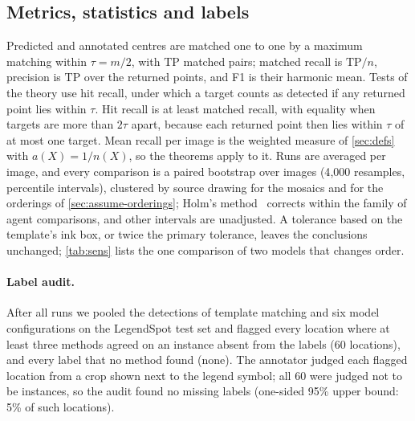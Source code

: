 \subsection{Metrics, statistics and labels}
\label{sec:stats}

Predicted and annotated centres are matched one to one by a maximum matching within $\tau = m/2$, with $\mathrm{TP}$ matched pairs; matched recall is $\mathrm{TP}/n$, precision is $\mathrm{TP}$ over the returned points, and F1 is their harmonic mean. Tests of the theory use hit recall, under which a target counts as detected if any returned point lies within $\tau$. Hit recall is at least matched recall, with equality when targets are more than $2\tau$ apart, because each returned point then lies within $\tau$ of at most one target. Mean recall per image is the weighted measure of \cref{sec:defs} with $a(X) = 1/n(X)$, so the theorems apply to it. Runs are averaged per image, and every comparison is a paired bootstrap over images (4{,}000 resamples, percentile intervals), clustered by source drawing for the mosaics and for the orderings of \cref{sec:assume-orderings}; Holm's method~\cite{holm1979simple} corrects within the family of agent comparisons, and other intervals are unadjusted. A tolerance based on the template's ink box, or twice the primary tolerance, leaves the conclusions unchanged; \cref{tab:sens} lists the one comparison of two models that changes order.

\paragraph{Label audit.} After all runs we pooled the detections of template matching and six model configurations on the LegendSpot test set and flagged every location where at least three methods agreed on an instance absent from the labels (60 locations), and every label that no method found (none). The annotator judged each flagged location from a crop shown next to the legend symbol; all 60 were judged not to be instances, so the audit found no missing labels (one-sided 95\% upper bound: 5\% of such locations).
